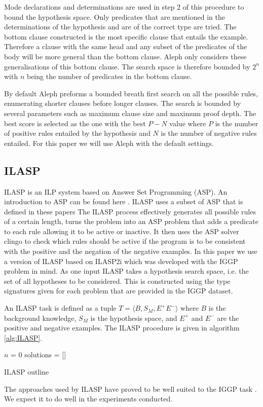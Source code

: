 Mode declarations and determinations are used in step 2 of this procedure to bound the hypothesis space. Only predicates that are mentioned in the determinations of the hypothesis and are of the correct type are tried. The bottom clause constructed is the most specific clause that entails the example. Therefore a clause with the same head and any subset of the predicates of the body will be more general than the bottom clause. Aleph only considers these generalisations of this bottom clause. The search space is therefore bounded by $2^n$ with $n$ being the number of predicates in the bottom clause.

By default Aleph preforms a bounded breath first search on all the possible rules, enumerating shorter clauses before longer clauses. The search is bounded by several parameters such as maximum clause size and maximum proof depth. The best score is selected as the one with the best $P - N$ value where $P$ is the number of positive rules entailed by the hypothesis and $N$ is the number of negative rules entailed. For this paper we will use Aleph with the default settings.

\subsection{ILASP}

ILASP is an ILP system based on Answer Set Programming (ASP). An introduction to ASP can be found here \cite{Corapi/ASP}. ILASP uses a subset of ASP that is defined in these papers\cite{ILASP-Manuel,MarkLaw/OG-ILASP,MarkLaw/Thesis} The ILASP process effectively generates all possible rules of a certain length, turns the problem into an ASP problem that adds a predicate to each rule allowing it to be active or inactive. It then uses the ASP solver clingo\cite{Clingo}  to check which rules should be active if the program is to be consistent with the positive and the negation of the negative examples\cite{MarkLaw/OG-ILASP,MarkLaw/Thesis}. In this paper we use a version of ILASP based on ILASP2i\cite{MarkLaw/ILASP2i} which was developed with the IGGP problem in mind\cite{Cropper/IGGP}. As one input ILASP takes a hypothesis search space, i.e. the set of all hypotheses to be considered. This is constructed using the type signatures given for each problem that are provided in the IGGP dataset.

An ILASP task is defined as a tuple $T = \langle B,S_M,E^+E^-\rangle$ where $B$ is the background knowledge, $S_M$ is the hypothesis space, and $E^+$ and $E^-$ are the positive and negative examples. The ILASP procedure is given in algorithm \ref{alg:ILASP}.
\begin{algorithm}[H]\label{alg:ILASP}
    \SetAlgoLined
    $n$ = 0\;
    solutions = []\;
    \caption{ILASP outline}
\end{algorithm}

The approaches used by ILASP have proved to be well suited to the IGGP task \cite{Cropper/IGGP}. We expect it to do well in the experiments conducted.